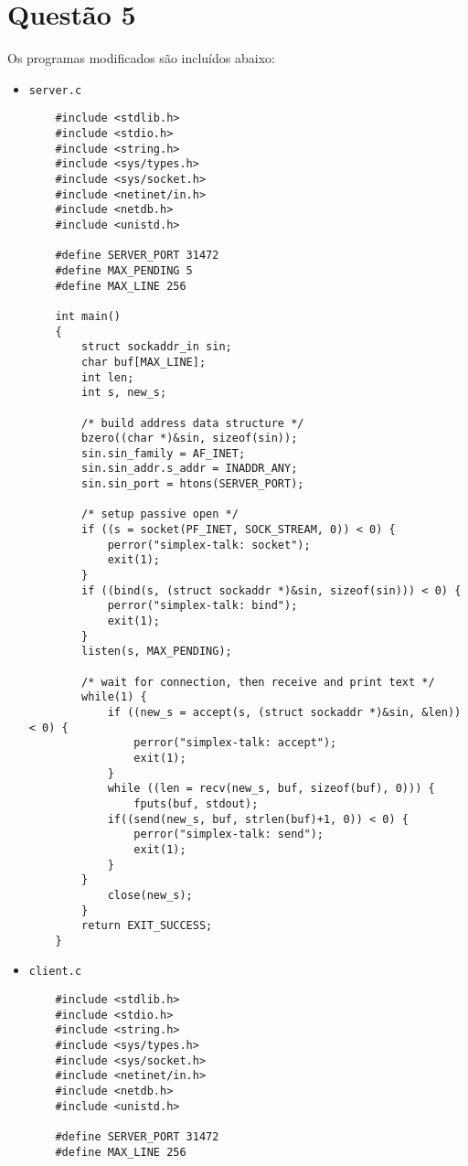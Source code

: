 \documentclass[a4paper,10pt]{article}
\begin{document}
\section{Questão 5}
    Os programas modificados são incluídos abaixo:
    
    \begin{itemize}
        \item {\tt server.c}
            \begin{lstlisting}
    #include <stdlib.h>
    #include <stdio.h>
    #include <string.h>
    #include <sys/types.h>
    #include <sys/socket.h>
    #include <netinet/in.h>
    #include <netdb.h>
    #include <unistd.h>
    
    #define SERVER_PORT 31472
    #define MAX_PENDING 5
    #define MAX_LINE 256
    
    int main()
    {
    	struct sockaddr_in sin;
    	char buf[MAX_LINE];
    	int len;
    	int s, new_s;
    
    	/* build address data structure */
    	bzero((char *)&sin, sizeof(sin));
    	sin.sin_family = AF_INET;
    	sin.sin_addr.s_addr = INADDR_ANY;
    	sin.sin_port = htons(SERVER_PORT);
    
    	/* setup passive open */
    	if ((s = socket(PF_INET, SOCK_STREAM, 0)) < 0) {
    		perror("simplex-talk: socket");
    		exit(1);
    	}
    	if ((bind(s, (struct sockaddr *)&sin, sizeof(sin))) < 0) {
    		perror("simplex-talk: bind");
    		exit(1);
    	}
    	listen(s, MAX_PENDING);
    
    	/* wait for connection, then receive and print text */
    	while(1) {
    		if ((new_s = accept(s, (struct sockaddr *)&sin, &len)) < 0) {
    			perror("simplex-talk: accept");
    			exit(1);
    		}
    		while ((len = recv(new_s, buf, sizeof(buf), 0))) {
    			fputs(buf, stdout);
    		if((send(new_s, buf, strlen(buf)+1, 0)) < 0) {
    			perror("simplex-talk: send");
    			exit(1);
    		}
    	}
    		close(new_s);
    	}
    	return EXIT_SUCCESS;
    }
            \end{lstlisting}
        
        \item {\tt client.c}
            \begin{lstlisting}
    #include <stdlib.h>
    #include <stdio.h>
    #include <string.h>
    #include <sys/types.h>
    #include <sys/socket.h>
    #include <netinet/in.h>
    #include <netdb.h>
    #include <unistd.h>
    
    #define SERVER_PORT 31472
    #define MAX_LINE 256
    

\end{lstlisting}
\end{itemize}
\end{document}
